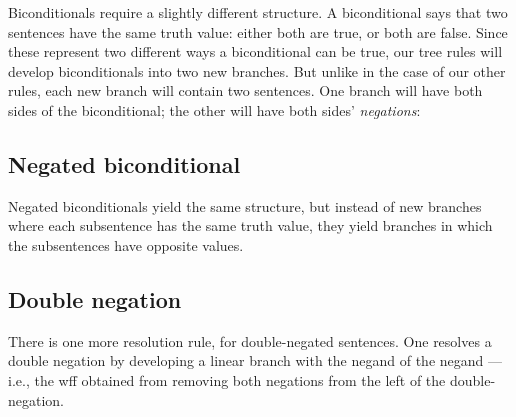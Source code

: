 Biconditionals require a slightly different structure. A biconditional says that two sentences have the same truth value: either both are true, or both are false. Since these represent two different ways a biconditional can be true, our tree rules will develop biconditionals into two new branches. But unlike in the case of our other rules, each new branch will contain two sentences. One branch will have both sides of the biconditional; the other will have both sides' \emph{negations}:


\subsection{Negated biconditional}
\begin{groupitems}
Negated biconditionals yield the same structure, but instead of new branches where each subsentence has the same truth value, they yield branches in which the subsentences have opposite values.

\end{groupitems}

\subsection{Double negation}

There is one more resolution rule, for double-negated sentences. One resolves a double negation by developing a linear branch with the negand of the negand --- i.e., the wff obtained from removing both negations from the left of the double-negation.

\label{SL.treerules.end}
